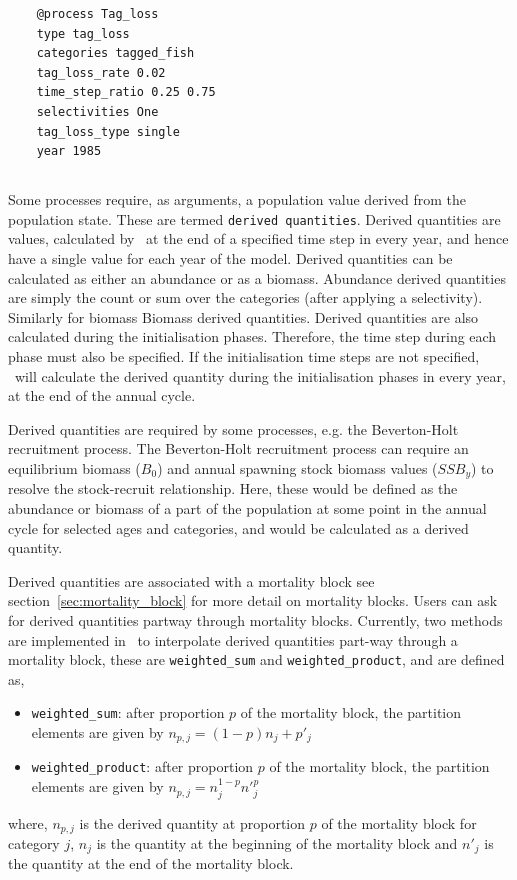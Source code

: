 {\small{\begin{verbatim}
	@process Tag_loss
	type tag_loss
	categories tagged_fish
	tag_loss_rate 0.02
	time_step_ratio 0.25 0.75
	selectivities One
	tag_loss_type single
	year 1985
		\end{verbatim}}}

\subsection{\label{sec:derived-quantities}}

Some processes require, as arguments, a population value derived from the population state. These are termed \texttt{derived quantities}. Derived quantities are values, calculated by \CNAME\ at the end of a specified time step in every year, and hence have a single value for each year of the model. Derived quantities can be calculated as either an abundance or as a biomass. Abundance derived quantities are simply the count or sum over the categories (after applying a selectivity). Similarly for biomass Biomass derived quantities. Derived quantities are also calculated during the initialisation phases. Therefore, the time step during each phase must also be specified. If the initialisation time steps are not specified, \CNAME\ will calculate the derived quantity during the initialisation phases in every year, at the end of the annual cycle.

Derived quantities are required by some processes, e.g. the Beverton-Holt recruitment process. The Beverton-Holt recruitment process can require an equilibrium biomass ($B_0$) and annual spawning stock biomass values ($SSB_y$) to resolve the stock-recruit relationship. Here, these would be defined as the abundance or biomass of a part of the population at some point in the annual cycle for selected ages and categories, and would be calculated as a derived quantity.

Derived quantities are associated with a mortality block see section~\ref{sec:mortality_block} for more detail on mortality blocks. Users can ask for derived quantities partway through mortality blocks. Currently, two methods are implemented in \CNAME\ to interpolate derived quantities part-way through a mortality block, these are \texttt{weighted\_sum} and \texttt{weighted\_product}, and are defined as,
\begin{itemize}
	\item \texttt{weighted\_sum}: after proportion $p$ of the mortality block, the partition elements are given by $n_{p,j} = (1 - p)n_j + p'_j$

	\item \texttt{weighted\_product}: after proportion $p$ of the mortality block, the partition elements are given by $n_{p,j} = n_j^{1-p} n'^p_j$
\end{itemize}
where, $n_{p,j}$ is the derived quantity at proportion $p$ of the mortality block for category $j$, $n_j$ is the quantity at the beginning of the mortality block and $n'_j$ is the quantity at the end of the mortality block.

